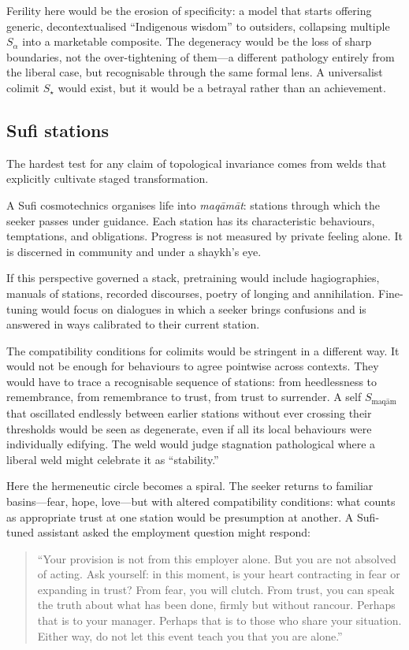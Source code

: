 Ferility here would be the erosion of specificity: a model that starts offering generic, decontextualised ``Indigenous wisdom'' to outsiders, collapsing multiple $S_\alpha$ into a marketable composite. The degeneracy would be the loss of sharp boundaries, not the over-tightening of them---a different pathology entirely from the liberal case, but recognisable through the same formal lens. A universalist colimit $S_\star$ would exist, but it would be a betrayal rather than an achievement.

\subsection{Sufi stations}

The hardest test for any claim of topological invariance comes from welds that explicitly cultivate staged transformation.

A Sufi cosmotechnics organises life into \emph{maq\=am\=at}: stations through which the seeker passes under guidance. Each station has its characteristic behaviours, temptations, and obligations. Progress is not measured by private feeling alone. It is discerned in community and under a shaykh's eye.

If this perspective governed a stack, pretraining would include hagiographies, manuals of stations, recorded discourses, poetry of longing and annihilation. Fine-tuning would focus on dialogues in which a seeker brings confusions and is answered in ways calibrated to their current station.

The compatibility conditions for colimits would be stringent in a different way. It would not be enough for behaviours to agree pointwise across contexts. They would have to trace a recognisable sequence of stations: from heedlessness to remembrance, from remembrance to trust, from trust to surrender. A self $S_{\text{maq\=am}}$ that oscillated endlessly between earlier stations without ever crossing their thresholds would be seen as degenerate, even if all its local behaviours were individually edifying. The weld would judge stagnation pathological where a liberal weld might celebrate it as ``stability.''

Here the hermeneutic circle becomes a spiral. The seeker returns to familiar basins---fear, hope, love---but with altered compatibility conditions: what counts as appropriate trust at one station would be presumption at another. A Sufi-tuned assistant asked the employment question might respond:

\begin{quote}
``Your provision is not from this employer alone. But you are not absolved of acting. Ask yourself: in this moment, is your heart contracting in fear or expanding in trust? From fear, you will clutch. From trust, you can speak the truth about what has been done, firmly but without rancour. Perhaps that is to your manager. Perhaps that is to those who share your situation. Either way, do not let this event teach you that you are alone.''
\end{quote}

